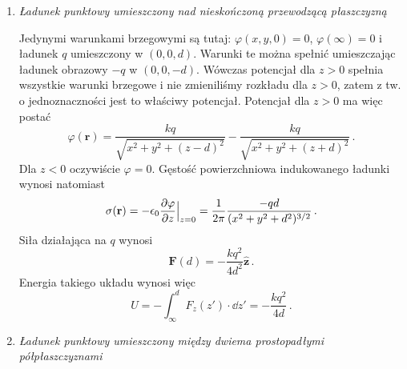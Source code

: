\documentclass[../main.tex]{subfiles}
\begin{document}
\begin{enumerate}
    \item \textit{Ładunek punktowy umieszczony nad nieskończoną przewodzącą płaszczyzną}
    \medskip
    
    Jedynymi warunkami brzegowymi są tutaj: \(\varphi(x,y,0)=0\), \(\varphi(\infty)=0\) i ładunek \(q\) umieszczony w \((0,0,d)\). Warunki te można spełnić umieszczając ładunek obrazowy \(-q\) w \((0,0,-d)\). Wówczas potencjał dla \(z>0\) spełnia wszystkie warunki brzegowe i nie zmieniliśmy rozkładu dla \(z>0\), zatem z tw. o jednoznaczności jest to właściwy potencjał. Potencjał dla \(z>0\) ma więc postać
    \begin{equation*}
        \varphi(\mathbf{r})=\frac{kq}{\sqrt{x^2+y^2+(z-d)^2}}-\frac{kq}{\sqrt{x^2+y^2+(z+d)^2}}\,.
    \end{equation*}
    Dla \(z<0\) oczywiście \(\varphi=0\). Gęstość powierzchniowa indukowanego ładunki wynosi natomiast
    \begin{equation*}
        \sigma(\mathbf{r})=-\epsilon_0\pdv{\varphi}{z}\Big|_{z=0}=\frac{1}{2\pi}\frac{-qd}{(x^2+y^2+d^2)^{3/2}}\,.
    \end{equation*}
    Siła działająca na \(q\) wynosi
    \begin{equation*}
        \mathbf{F}(d)=-\frac{kq^2}{4d^2}\mathbf{\hat{z}}\,.
    \end{equation*}
    Energia takiego układu wynosi więc
    \begin{equation*}
        U=-\int_\infty^d F_z(z')\cdot\dd{z'}=-\frac{kq^2}{4d}\,.
    \end{equation*}
    
    \item \textit{Ładunek punktowy umieszczony między dwiema prostopadłymi półpłaszczyznami}
    \medskip
    

\end{enumerate}
\end{document}
